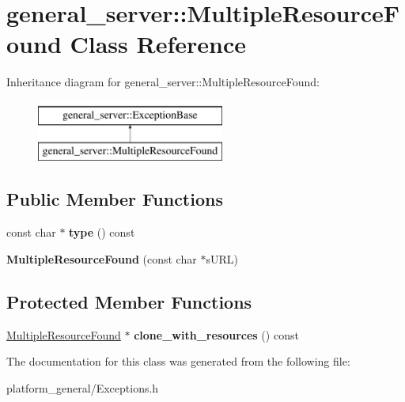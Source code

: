 \hypertarget{classgeneral__server_1_1MultipleResourceFound}{\section{general\-\_\-server\-:\-:\-Multiple\-Resource\-Found \-Class \-Reference}
\label{classgeneral__server_1_1MultipleResourceFound}
}
\-Inheritance diagram for general\-\_\-server\-:\-:\-Multiple\-Resource\-Found\-:\begin{figure}[H]
\begin{center}
\leavevmode
\includegraphics[height=2.000000cm]{classgeneral__server_1_1MultipleResourceFound}
\end{center}
\end{figure}
\subsection*{\-Public \-Member \-Functions}
\begin{DoxyCompactItemize}
\item 
\hypertarget{classgeneral__server_1_1MultipleResourceFound_ac5e2405e28ea1a2095f65e736e33d578}{const char $\ast$ {\bfseries type} () const }\label{classgeneral__server_1_1MultipleResourceFound_ac5e2405e28ea1a2095f65e736e33d578}

\item 
\hypertarget{classgeneral__server_1_1MultipleResourceFound_a63f9dbca4dab4ce802ed6567a0422f9b}{{\bfseries \-Multiple\-Resource\-Found} (const char $\ast$s\-U\-R\-L)}\label{classgeneral__server_1_1MultipleResourceFound_a63f9dbca4dab4ce802ed6567a0422f9b}

\end{DoxyCompactItemize}
\subsection*{\-Protected \-Member \-Functions}
\begin{DoxyCompactItemize}
\item 
\hypertarget{classgeneral__server_1_1MultipleResourceFound_af441246c6e0d13257b1e9173450b4377}{\hyperlink{classgeneral__server_1_1MultipleResourceFound}{\-Multiple\-Resource\-Found} $\ast$ {\bfseries clone\-\_\-with\-\_\-resources} () const }\label{classgeneral__server_1_1MultipleResourceFound_af441246c6e0d13257b1e9173450b4377}

\end{DoxyCompactItemize}


\-The documentation for this class was generated from the following file\-:\begin{DoxyCompactItemize}
\item 
platform\-\_\-general/\-Exceptions.\-h\end{DoxyCompactItemize}
